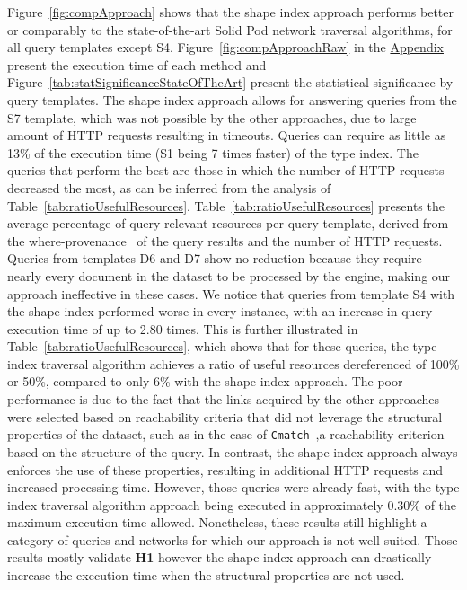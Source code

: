 Figure~\ref{fig:compApproach} shows that the shape index approach performs better or comparably to the state-of-the-art Solid Pod network traversal algorithms, for all query templates except S4.
Figure~\ref{fig:compApproachRaw} in the \hyperref[sec:appendix]{Appendix} present the execution time of each method and Figure~\ref{tab:statSignificanceStateOfTheArt} present the statistical significance by query templates.
The shape index approach allows for answering queries from the S7 template, which was not possible by the other approaches, due to large amount of HTTP requests resulting in timeouts.
Queries can require as little as 13\% of the execution time (S1 being 7 times faster) of the type index.
The queries that perform the best are those in which the number of HTTP requests decreased the most, as can be inferred from the analysis of Table~\ref{tab:ratioUsefulResources}.
Table~\ref{tab:ratioUsefulResources} presents the average percentage of query-relevant resources per query template, derived from the where-provenance~\cite{buneman2001and} of the query results and the number of HTTP requests. 
Queries from templates D6 and D7 show no reduction because they require nearly every document in the dataset to be processed by the engine, making our approach ineffective in these cases.
We notice that queries from template S4 with the shape index performed worse in every instance, with an increase in query execution time of up to 2.80 times.
This is further illustrated in Table~\ref{tab:ratioUsefulResources}, which shows that for these queries, the type index traversal algorithm achieves a ratio of useful resources dereferenced of 100\% or 50\%, compared to only 6\% with the shape index approach.
The poor performance is due to the fact that the links acquired by the other approaches were selected based on reachability criteria that did not leverage the structural properties of the dataset, such as in the case of \texttt{Cmatch}~\cite{hartig2016walking},a reachability criterion based on the structure of the query.
In contrast, the shape index approach always enforces the use of these properties, resulting in additional HTTP requests and increased processing time.
However, those queries were already fast, with the type index traversal algorithm approach being executed in approximately 0.30\% of the maximum execution time allowed.
Nonetheless, these results still highlight a category of queries and networks for which our approach is not well-suited.
Those results mostly validate \textbf{H1} however the shape index approach can drastically increase the execution time when the structural properties are not used.

